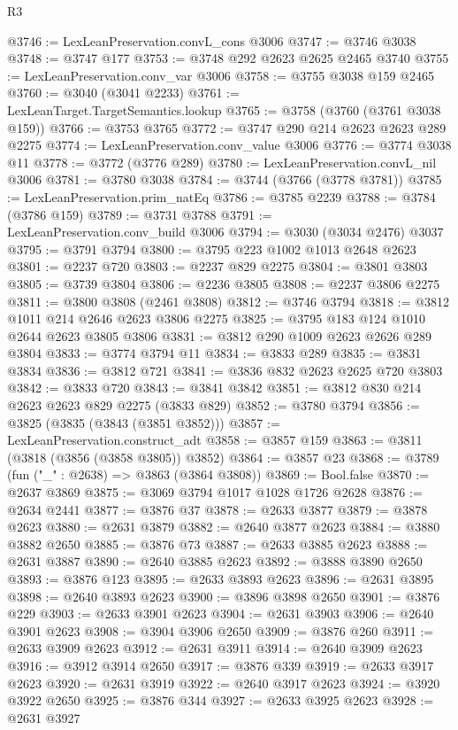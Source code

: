 \begin{lexlean}{R3}
\begin{coremodule}
@3746 := LexLeanPreservation.convL_cons @3006
@3747 := @3746 @3038
@3748 := @3747 @177
@3753 := @3748 @292 @2623 @2625 @2465 @3740
@3755 := LexLeanPreservation.conv_var @3006
@3758 := @3755 @3038 @159 @2465
@3760 := @3040 (@3041 @2233)
@3761 := LexLeanTarget.TargetSemantics.lookup
@3765 := @3758 (@3760 (@3761 @3038 @159))
@3766 := @3753 @3765
@3772 := @3747 @290 @214 @2623 @2623 @289 @2275
@3774 := LexLeanPreservation.conv_value @3006
@3776 := @3774 @3038 @11
@3778 := @3772 (@3776 @289)
@3780 := LexLeanPreservation.convL_nil @3006
@3781 := @3780 @3038
@3784 := @3744 (@3766 (@3778 @3781))
@3785 := LexLeanPreservation.prim_natEq
@3786 := @3785 @2239
@3788 := @3784 (@3786 @159)
@3789 := @3731 @3788
@3791 := LexLeanPreservation.conv_build @3006
@3794 := @3030 (@3034 @2476) @3037
@3795 := @3791 @3794
@3800 := @3795 @223 @1002 @1013 @2648 @2623
@3801 := @2237 @720
@3803 := @2237 @829 @2275
@3804 := @3801 @3803
@3805 := @3739 @3804
@3806 := @2236 @3805
@3808 := @2237 @3806 @2275
@3811 := @3800 @3808 (@2461 @3808)
@3812 := @3746 @3794
@3818 := @3812 @1011 @214 @2646 @2623 @3806 @2275
@3825 := @3795 @183 @124 @1010 @2644 @2623 @3805 @3806
@3831 := @3812 @290 @1009 @2623 @2626 @289 @3804
@3833 := @3774 @3794 @11
@3834 := @3833 @289
@3835 := @3831 @3834
@3836 := @3812 @721
@3841 := @3836 @832 @2623 @2625 @720 @3803
@3842 := @3833 @720
@3843 := @3841 @3842
@3851 := @3812 @830 @214 @2623 @2623 @829 @2275 (@3833 @829)
@3852 := @3780 @3794
@3856 := @3825 (@3835 (@3843 (@3851 @3852)))
@3857 := LexLeanPreservation.construct_adt
@3858 := @3857 @159
@3863 := @3811 (@3818 (@3856 (@3858 @3805)) @3852)
@3864 := @3857 @23
@3868 := @3789 (fun ("_" : @2638) => @3863 (@3864 @3808))
@3869 := Bool.false
@3870 := @2637 @3869
@3875 := @3069 @3794 @1017 @1028 @1726 @2628
@3876 := @2634 @2441
@3877 := @3876 @37
@3878 := @2633 @3877
@3879 := @3878 @2623
@3880 := @2631 @3879
@3882 := @2640 @3877 @2623
@3884 := @3880 @3882 @2650
@3885 := @3876 @73
@3887 := @2633 @3885 @2623
@3888 := @2631 @3887
@3890 := @2640 @3885 @2623
@3892 := @3888 @3890 @2650
@3893 := @3876 @123
@3895 := @2633 @3893 @2623
@3896 := @2631 @3895
@3898 := @2640 @3893 @2623
@3900 := @3896 @3898 @2650
@3901 := @3876 @229
@3903 := @2633 @3901 @2623
@3904 := @2631 @3903
@3906 := @2640 @3901 @2623
@3908 := @3904 @3906 @2650
@3909 := @3876 @260
@3911 := @2633 @3909 @2623
@3912 := @2631 @3911
@3914 := @2640 @3909 @2623
@3916 := @3912 @3914 @2650
@3917 := @3876 @339
@3919 := @2633 @3917 @2623
@3920 := @2631 @3919
@3922 := @2640 @3917 @2623
@3924 := @3920 @3922 @2650
@3925 := @3876 @344
@3927 := @2633 @3925 @2623
@3928 := @2631 @3927

\end{coremodule}
\end{lexlean}
